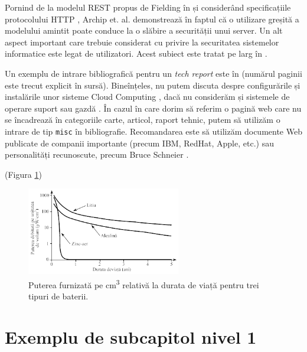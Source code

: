 Pornind de la modelul REST propus de Fielding în \cite{thesis:fielding:2000} și considerând specificațiile protocolului HTTP \cite{misc:web:rfc7231}, Archip et. al. demonstrează în \cite{inproc:archip:restful:2018} faptul că o utilizare greșită a modelului amintit poate conduce la o slăbire a securității unui server. Un alt aspect important care trebuie considerat cu privire la securitatea sistemelor informatice este legat de utilizatori. Acest subiect este tratat pe larg în \cite{incollection:ARASEC2020}.

Un exemplu de intrare bibliografică pentru un \textit{tech report} este în \cite[p.~13]{IEEEexample:techreptypeii} (numărul paginii este trecut explicit în sursă). Bineînțeles, nu putem discuta despre configurările și instalările unor sisteme Cloud Computing \cite[p.~113]{book:marinescu:2018}, dacă nu considerăm și sistemele de operare suport sau gazdă \cite{book:operating_systems:2014}. În cazul în care dorim să referim o pagină web care nu se încadrează în categoriile carte, articol, raport tehnic, putem să utilizăm o intrare de tip \verb|misc| în bibliografie. Recomandarea este să utilizăm documente Web publicate de companii importante (precum IBM, RedHat, Apple, etc.) sau personalități recunoscute, precum Bruce Schneier \cite{misc:web:schneier2021}.

\textcolor{gray}{\lipsum}(Figura \ref{fig:puterea_furnizata_pe_cm_cub})

\begin{figure}[H]
    \centering
    \includegraphics[width=0.6\textwidth]{continut/capitol1/figuri/puterea_furnizata_pe_cm_cub.png}
    \caption{Puterea furnizată pe cm\textsuperscript{3} relativă la durata de viață pentru trei tipuri de baterii.}
    \label{fig:puterea_furnizata_pe_cm_cub}
\end{figure}

\textcolor{gray}{\lipsum}

\section{Exemplu de subcapitol nivel 1}
\label{cap:cap1:ex-subcapitol}

